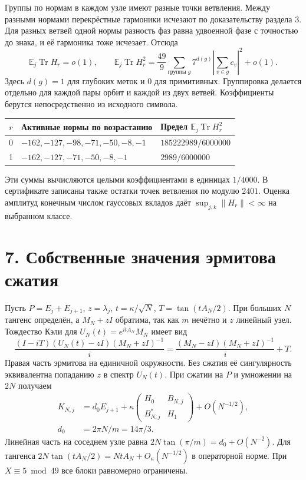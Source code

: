 \documentclass[11pt,a4paper]{article}
\newcommand{\Tr}{\operatorname{Tr}}
\newcommand{\EE}{\mathbb E}
\newcommand{\sect}[1]{\section*{\sffamily\color{ink}#1}}
\begin{document}
Группы по нормам в каждом узле имеют разные точки ветвления. Между разными нормами перекрёстные гармоники исчезают по доказательству раздела 3. Для разных ветвей одной нормы разность фаз равна удвоенной фазе с точностью до знака, и её гармоника тоже исчезает. Отсюда
\[
 \EE_j\Tr H_r=o(1),\qquad
 \EE_j\Tr H_r^2=\frac{49}{9}\sum_{\text{группы }g}
  7^{d(g)}\left|\sum_{v\in g}c_v\right|^2+o(1).
\]
Здесь \(d(g)=1\) для глубоких меток и \(0\) для примитивных. Группировка делается отдельно для каждой пары орбит и каждой из двух ветвей. Коэффициенты берутся непосредственно из исходного символа.
\begin{center}
\begin{tabular}{cll}
\toprule
\(r\) & Активные нормы по возрастанию & Предел \(\EE_j\Tr H_r^2\)\\
\midrule
0 & \(-162,-127,-98,-71,-50,-8,-1\) & \(185222989/6000000\)\\
1 & \(-162,-127,-71,-50,-8,-1\) & \(2989/6000000\)\\
\bottomrule
\end{tabular}
\end{center}
Эти суммы вычисляются целыми коэффициентами в единицах \(1/4000\). В сертификате записаны также остатки точек ветвления по модулю \(2401\). Оценка амплитуд конечным числом гауссовых вкладов даёт \(\sup_{j,k}\|H_r\|<\infty\) на выбранном классе.

\newpage
\sect{7. Собственные значения эрмитова сжатия}
Пусть \(P=E_j+E_{j+1}\), \(z=\lambda_j\), \(t=\kappa/\sqrt N\), \(T=\tan(tA_N/2)\). При больших \(N\) тангенс определён, а \(M_N+zI\) обратима, так как \(m\) нечётно и \(z\) линейный узел. Тождество Кэли для \(U_N(t)=e^{itA_N}M_N\) имеет вид
\[
 \frac{(I-iT)(U_N(t)-zI)(M_N+zI)^{-1}}{i}
    = \frac{(M_N-zI)(M_N+zI)^{-1}}{i}+T.
\]
Правая часть эрмитова на единичной окружности. Без сжатия её сингулярность эквивалентна попаданию \(z\) в спектр \(U_N(t)\). При сжатии на \(P\) и умножении на \(2N\) получаем
\[
 \begin{split}
   K_{N,j}
   &=d_0 E_{j+1}+\kappa
       \begin{pmatrix} H_0&B_{N,j}\\B^*_{N,j}&H_1\end{pmatrix}
       +O(N^{-1/2}),\\
   d_0&=2\pi N/m=14\pi/3 .
 \end{split}
\]
Линейная часть на соседнем узле равна \(2N\tan(\pi/m)=d_0+O(N^{-2})\). Для тангенса \(2N\tan(tA_N/2)=NtA_N+O_\kappa(N^{-1/2})\) в операторной норме. При \(X\equiv5\bmod49\) все блоки равномерно ограничены.
\end{document}
